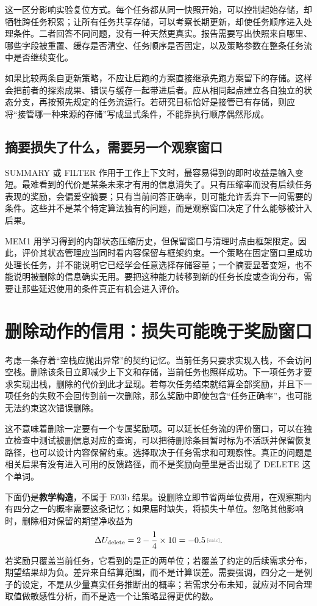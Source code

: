 这一区分影响实验复位方式。每个任务都从同一快照开始，可以控制起始存储，却牺牲跨任务积累；让所有任务共享存储，可以考察长期更新，却使任务顺序进入处理条件。二者回答不同问题，没有一种天然更真实。报告需要写出快照来自哪里、哪些字段被重置、缓存是否清空、任务顺序是否固定，以及策略参数在整条任务流中是否继续变化。

如果比较两条自更新策略，不应让后跑的方案直接继承先跑方案留下的存储。这样会把前者的探索成果、错误与缓存一起带进后者。应从相同起点建立各自独立的状态分支，再按预先规定的任务流运行。若研究目标恰好是接管已有存储，则应将“接管哪一种来源的存储”写成显式条件，不能靠执行顺序偶然形成。

\subsection{摘要损失了什么，需要另一个观察窗口}

SUMMARY 或 FILTER 作用于工作上下文时，最容易得到的即时收益是输入变短。最难看到的代价是某条未来才有用的信息消失了。只有压缩率而没有后续任务表现的奖励，会偏爱空摘要；只有当前问答正确率，则可能允许丢弃下一问需要的条件。这些并不是某个特定算法独有的问题，而是观察窗口决定了什么能够被计入后果。

MEM1 用学习得到的内部状态压缩历史，但保留窗口与清理时点由框架限定\cite{mem1-2506}。因此，评价其状态管理应当同时看内容保留与框架约束。一个策略在固定窗口里成功处理长任务，并不能说明它已经学会任意选择存储容量；一个摘要显著变短，也不能说明被删除的信息确实无用。要把这种能力转移到新的任务长度或查询分布，需要让那些延迟使用的条件真正有机会进入评价。

\section{删除动作的信用：损失可能晚于奖励窗口}
\label{sec:ch06-delete-credit}

考虑一条存着“空栈应抛出异常”的契约记忆。当前任务只要求实现入栈，不会访问空栈。删除该条目立即减少上下文和存储，当前任务也照样成功。下一项任务才要求实现出栈，删除的代价到此才显现。若每次任务结束就结算全部奖励，并且下一项任务的失败不会回传到前一次删除，那么奖励中即使包含“任务正确率”，也可能无法约束这次错误删除。

这不意味着删除一定要有一个专属奖励项。可以延长任务流的评价窗口，可以在独立检查中测试被删信息对应的查询，可以把待删除条目暂时标为不活跃并保留恢复路径，也可以设计内容保留约束。选择取决于任务需求和可观察性。真正的问题是相关后果有没有进入可用的反馈路径，而不是奖励向量里是否出现了 DELETE 这个单词。

下面仍是\textbf{教学构造}，不属于 E03b 结果。设删除立即节省两单位费用，在观察期内有四分之一的概率需要这条记忆；如果届时缺失，将损失十单位。忽略其他影响时，删除相对保留的期望净收益为
\begin{equation}
\Delta U_{\rm delete}=2-\frac14\times10
=\calcnum{-0.5}.
\end{equation}
若奖励只覆盖当前任务，它看到的是正的两单位；若覆盖了约定的后续需求分布，期望结果却为负。差异来自结算范围，而不是计算误差。需要强调，四分之一是例子的设定，不是从少量真实任务推断出的概率；若需求分布未知，就应对不同合理取值做敏感性分析，而不是选一个让策略显得更优的数。

